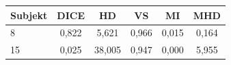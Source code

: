 \begin{tabular}{l c c c c c}
 \hline
Subjekt & DICE & HD & VS & MI & MHD \\ \hline
8 & 0,822 & 5,621 & 0,966 & 0,015 & 0,164 \\
15 & 0,025 & 38,005 & 0,947 & 0,000 & 5,955 \\
\hline 
 \end{tabular}
